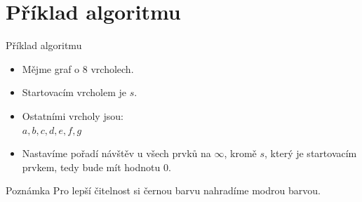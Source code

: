 \documentclass[10pt, czech]{beamer}
\begin{document}
\section{Příklad algoritmu}
\begin{frame}{Příklad algoritmu}
    \begin{Example}
        \begin{itemize}
            \item Mějme graf o 8 vrcholech.
            \item Startovacím vrcholem je $s$.
            \item Ostatními vrcholy jsou:\\
                $a, b, c, d, e, f, g$
            \item Nastavíme pořadí návštěv u všech prvků na $\infty$, kromě $s$, který je               startovacím prvkem, tedy bude mít hodnotu $0$.
        \end{itemize}
    \end{Example}

    \begin{block}{Poznámka}
        Pro lepší čitelnost si černou barvu nahradíme modrou barvou.
    \end{block}
\end{frame}
\end{document}
